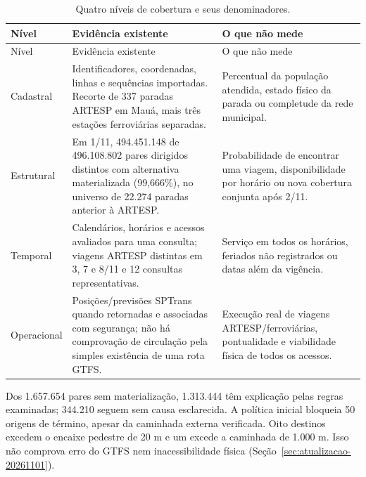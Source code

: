 \begin{longtable}{>{\raggedright\arraybackslash}p{2.5cm}p{6.1cm}p{6.1cm}}
\caption{Quatro níveis de cobertura e seus denominadores.}\label{tab:niveis-cobertura}\\\hline
Nível & Evidência existente & O que não mede\\\hline\endfirsthead
\hline Nível & Evidência existente & O que não mede\\\hline\endhead\hline\endfoot
Cadastral & Identificadores, coordenadas, linhas e sequências importadas. Recorte de 337 paradas ARTESP em Mauá, mais três estações ferroviárias separadas. & Percentual da população atendida, estado físico da parada ou completude da rede municipal.\\[4pt]
Estrutural & Em 1/11, 494.451.148 de 496.108.802 pares dirigidos distintos com alternativa materializada (99,666\%), no universo de 22.274 paradas anterior à ARTESP. & Probabilidade de encontrar uma viagem, disponibilidade por horário ou nova cobertura conjunta após 2/11.\\[4pt]
Temporal & Calendários, horários e acessos avaliados para uma consulta; viagens ARTESP distintas em 3, 7 e 8/11 e 12 consultas representativas. & Serviço em todos os horários, feriados não registrados ou datas além da vigência.\\[4pt]
Operacional & Posições/previsões SPTrans quando retornadas e associadas com segurança; não há comprovação de circulação pela simples existência de uma rota GTFS. & Execução real de viagens ARTESP/ferroviárias, pontualidade e viabilidade física de todos os acessos.\\
\end{longtable}
\endgroup
Dos 1.657.654 pares sem materialização, 1.313.444 têm explicação pelas regras examinadas; 344.210 seguem sem causa esclarecida. A política inicial bloqueia 50 origens de término, apesar da caminhada externa verificada. Oito destinos excedem o encaixe pedestre de 20 m e um excede a caminhada de 1.000 m. Isso não comprova erro do GTFS nem inacessibilidade física (Seção~\ref{sec:atualizacao-20261101}).

